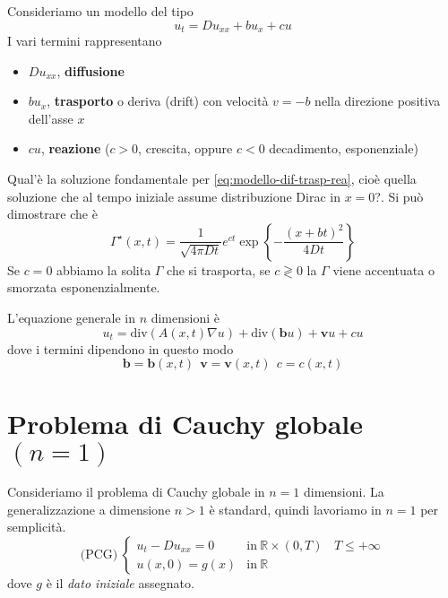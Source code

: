 \documentclass[10pt,a4paper,twoside,openright]{book}
\begin{document}
Consideriamo un modello del tipo
\begin{equation}
u_{t} =Du_{xx} +bu_{x} +cu
\label{eq:modello-dif-trasp-rea}
\end{equation}
I vari termini rappresentano
\begin{itemize}
\item $Du_{xx}$, \textbf{diffusione}
\item $bu_{x}$, \textbf{trasporto} o deriva (drift) con velocità $v=-b$ nella direzione positiva dell'asse $x$
\item $cu$, \textbf{reazione} ($c >0$, crescita, oppure $c< 0$ decadimento, esponenziale)
\end{itemize}

Qual'è la soluzione fondamentale per \eqref{eq:modello-dif-trasp-rea}, cioè quella soluzione che al tempo iniziale assume distribuzione Dirac in $x=0$?. Si può dimostrare che è
\begin{equation*}
\boxed{\Gamma ^{\star }(x,t) =\frac{1}{\sqrt{4\pi Dt}} e^{ct}\exp\left\{-\frac{(x+bt)^{2}}{4Dt}\right\}}
\end{equation*}
Se $c=0$ abbiamo la solita $\Gamma $ che si trasporta, se $c\gtrless 0$ la $\Gamma $ viene accentuata o smorzata esponenzialmente.

L'equazione generale in $n$ dimensioni è
\begin{equation*}
u_{t} =\mathrm{div}(A(x,t) \nabla u) +\mathrm{div}(\mathbf{b} u) +\mathbf{v} u+cu
\end{equation*}
dove i termini dipendono in questo modo
\begin{equation*}
\mathbf{b} =\mathbf{b}(x,t) \ \ \mathbf{v} =\mathbf{v}(x,t) \ \ c=c(x,t)
\end{equation*}
\section{Problema di Cauchy globale \texorpdfstring{$(n=1)$}{n=1}}

Consideriamo il problema di Cauchy globale in $n=1$ dimensioni. La generalizzazione a dimensione $n >1$ è standard, quindi lavoriamo in $n=1$ per semplicità.
\begin{equation*}
\text{(PCG)} \ \begin{cases}
u_{t} -Du_{xx} =0 & \text{in} \ \mathbb{R} \times (0,T) \ \ \ \ T\leqslant +\infty \\
u(x,0) =g(x) & \text{in} \ \mathbb{R}
\end{cases}
\end{equation*}
dove $g$ è il \textit{dato iniziale} assegnato.
\end{document}
